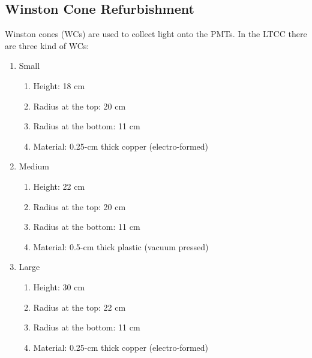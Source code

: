 \subsection{Winston Cone Refurbishment}

Winston cones (WCs) are used to collect light onto the PMTs. In the LTCC there are three kind of WCs:

\begin{enumerate}

\item Small
	\begin{enumerate}
		\item Height: 18 cm
		\item Radius at the top: 20 cm
		\item Radius at the bottom: 11 cm
		\item Material: 0.25-cm thick copper (electro-formed)
	\end{enumerate}

	\item Medium
	\begin{enumerate}
		\item Height: 22 cm
		\item Radius at the top: 20 cm
		\item Radius at the bottom: 11 cm
		\item Material: 0.5-cm thick plastic (vacuum pressed)
	\end{enumerate}

	\item Large
	\begin{enumerate}
		\item Height: 30 cm
		\item Radius at the top: 22 cm
		\item Radius at the bottom: 11 cm
		\item Material: 0.25-cm thick copper (electro-formed)
	\end{enumerate}
\end{enumerate}

